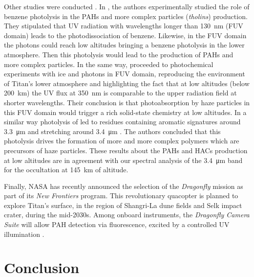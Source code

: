 \documentclass{arxiv-icarus}
\begin{document}
Other studies were conducted \citep{Gudipati2013,Yoon2014}. In \cite{Yoon2014}, the authors experimentally studied the role of benzene photolysis in the PAHs and more complex particles (\emph{tholins}) production. They stipulated that UV radiation with wavelengths longer than \SI{130}{nm} (FUV domain) leads to the photodissociation of benzene. Likewise, in the FUV domain the photons could reach low altitudes bringing a benzene photolysis in the lower atmosphere. Then this photolysis would lead to the production of PAHs and more complex particles.
In the same way, \cite{Gudipati2013,Couturier-Tamburelli2014} proceeded to photochemical experiments with  ice and photons in FUV domain, reproducing the environment of Titan's lower atmosphere and highlighting the fact that at low altitudes (below \SI{200}{km}) the UV flux at \SI{350}{nm} is comparable to the upper radiation field at shorter wavelengths. Their conclusion is that photoabsorption by haze particles in this FUV domain would trigger a rich solid-state chemistry at low altitudes. In a similar way photolysis of  led to residues containing aromatic signatures around \SI{3.3}{\um} and  stretching around \SI{3.4}{\um} \citep{Couturier-Tamburelli2015}. The authors concluded that this photolysis drives the formation of more and more complex polymers which are precursors of haze particles. These results about the PAHs and HACs production at low altitudes are in agreement with our spectral analysis of the \SI{3.4}{\um} band for the occultation at \SI{145}{km} of altitude.

Finally, NASA has recently announced the selection of the \emph{Dragonfly} mission \citep{Turtle2019} as part of its \emph{New Frontiers} program. This revolutionary quacopter is planned to explore Titan's surface, in the region of Shangri-La dune fields and Selk impact crater, during the mid-2030s. Among onboard instruments, the \emph{Dragonfly Camera Suite} will allow PAH detection via fluorescence, excited by a controlled UV illumination \citep{Lorenz2018}.


\section{Conclusion}
\label{concl}
\end{document}
